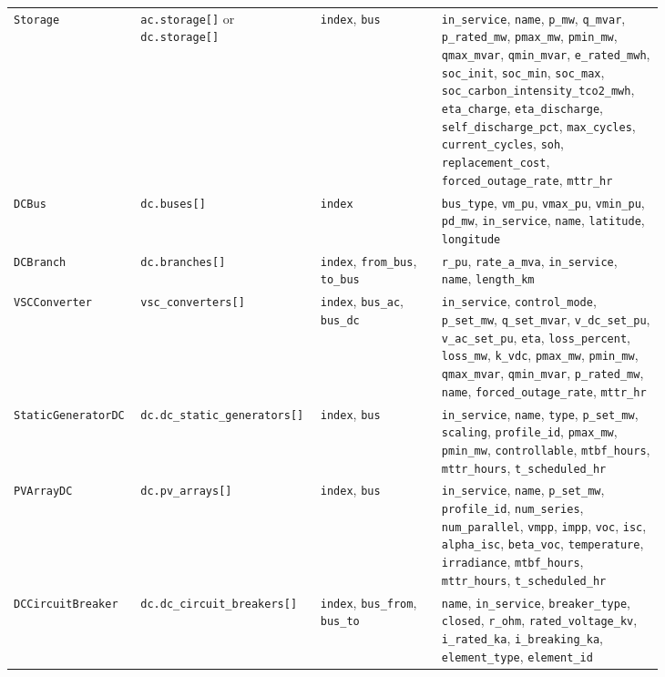 \begin{longtable}{L{0.14\linewidth}L{0.18\linewidth}L{0.18\linewidth}L{0.33\linewidth}}
\texttt{Storage} & \texttt{ac.storage[]} or \texttt{dc.storage[]} & \texttt{index}, \texttt{bus} & \texttt{in\_service}, \texttt{name}, \texttt{p\_mw}, \texttt{q\_mvar}, \texttt{p\_rated\_mw}, \texttt{pmax\_mw}, \texttt{pmin\_mw}, \texttt{qmax\_mvar}, \texttt{qmin\_mvar}, \texttt{e\_rated\_mwh}, \texttt{soc\_init}, \texttt{soc\_min}, \texttt{soc\_max}, \texttt{soc\_carbon\_intensity\_tco2\_mwh}, \texttt{eta\_charge}, \texttt{eta\_discharge}, \texttt{self\_discharge\_pct}, \texttt{max\_cycles}, \texttt{current\_cycles}, \texttt{soh}, \texttt{replacement\_cost}, \texttt{forced\_outage\_rate}, \texttt{mttr\_hr} \\
\texttt{DCBus} & \texttt{dc.buses[]} & \texttt{index} & \texttt{bus\_type}, \texttt{vm\_pu}, \texttt{vmax\_pu}, \texttt{vmin\_pu}, \texttt{pd\_mw}, \texttt{in\_service}, \texttt{name}, \texttt{latitude}, \texttt{longitude} \\
\texttt{DCBranch} & \texttt{dc.branches[]} & \texttt{index}, \texttt{from\_bus}, \texttt{to\_bus} & \texttt{r\_pu}, \texttt{rate\_a\_mva}, \texttt{in\_service}, \texttt{name}, \texttt{length\_km} \\
\texttt{VSCConverter} & \texttt{vsc\_converters[]} & \texttt{index}, \texttt{bus\_ac}, \texttt{bus\_dc} & \texttt{in\_service}, \texttt{control\_mode}, \texttt{p\_set\_mw}, \texttt{q\_set\_mvar}, \texttt{v\_dc\_set\_pu}, \texttt{v\_ac\_set\_pu}, \texttt{eta}, \texttt{loss\_percent}, \texttt{loss\_mw}, \texttt{k\_vdc}, \texttt{pmax\_mw}, \texttt{pmin\_mw}, \texttt{qmax\_mvar}, \texttt{qmin\_mvar}, \texttt{p\_rated\_mw}, \texttt{name}, \texttt{forced\_outage\_rate}, \texttt{mttr\_hr} \\
\texttt{StaticGeneratorDC} & \texttt{dc.dc\_static\_generators[]} & \texttt{index}, \texttt{bus} & \texttt{in\_service}, \texttt{name}, \texttt{type}, \texttt{p\_set\_mw}, \texttt{scaling}, \texttt{profile\_id}, \texttt{pmax\_mw}, \texttt{pmin\_mw}, \texttt{controllable}, \texttt{mtbf\_hours}, \texttt{mttr\_hours}, \texttt{t\_scheduled\_hr} \\
\texttt{PVArrayDC} & \texttt{dc.pv\_arrays[]} & \texttt{index}, \texttt{bus} & \texttt{in\_service}, \texttt{name}, \texttt{p\_set\_mw}, \texttt{profile\_id}, \texttt{num\_series}, \texttt{num\_parallel}, \texttt{vmpp}, \texttt{impp}, \texttt{voc}, \texttt{isc}, \texttt{alpha\_isc}, \texttt{beta\_voc}, \texttt{temperature}, \texttt{irradiance}, \texttt{mtbf\_hours}, \texttt{mttr\_hours}, \texttt{t\_scheduled\_hr} \\
\texttt{DCCircuitBreaker} & \texttt{dc.dc\_circuit\_breakers[]} & \texttt{index}, \texttt{bus\_from}, \texttt{bus\_to} & \texttt{name}, \texttt{in\_service}, \texttt{breaker\_type}, \texttt{closed}, \texttt{r\_ohm}, \texttt{rated\_voltage\_kv}, \texttt{i\_rated\_ka}, \texttt{i\_breaking\_ka}, \texttt{element\_type}, \texttt{element\_id} \\

\end{longtable}
